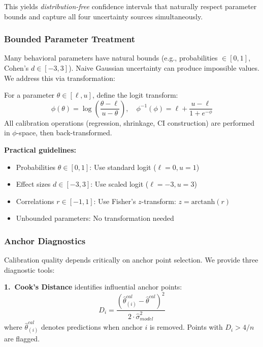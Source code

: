 This yields \textit{distribution-free} confidence intervals that naturally respect
parameter bounds and capture all four uncertainty sources simultaneously.

\subsubsection{Bounded Parameter Treatment}
\label{sec:AN-bounded}

Many behavioral parameters have natural bounds (e.g., probabilities $\in [0,1]$,
Cohen's $d \in [-3, 3]$). Naive Gaussian uncertainty can produce impossible values.
We address this via transformation:

\begin{definition}
\label{def:bounded-transform}
For a parameter $\theta \in [\ell, u]$, define the logit transform:
\begin{equation}
    \phi(\theta) = \log\left(\frac{\theta - \ell}{u - \theta}\right), \quad
    \phi^{-1}(\phi) = \ell + \frac{u - \ell}{1 + e^{-\phi}}
    \label{eq:logit-transform}
\end{equation}
All calibration operations (regression, shrinkage, CI construction) are performed
in $\phi$-space, then back-transformed.
\end{definition}

\textbf{Practical guidelines:}
\begin{itemize}[nosep]
    \item Probabilities $\theta \in [0,1]$: Use standard logit ($\ell = 0, u = 1$)
    \item Effect sizes $d \in [-3, 3]$: Use scaled logit ($\ell = -3, u = 3$)
    \item Correlations $r \in [-1, 1]$: Use Fisher's $z$-transform: $z = \text{arctanh}(r)$
    \item Unbounded parameters: No transformation needed
\end{itemize}

\subsubsection{Anchor Diagnostics}
\label{sec:AN-anchor-diagnostics}

Calibration quality depends critically on anchor point selection. We provide three
diagnostic tools:

\textbf{1.\ Cook's Distance} identifies influential anchor points:
\begin{equation}
    D_i = \frac{(\hat{\theta}^{cal}_{(i)} - \hat{\theta}^{cal})^2}{2 \cdot \hat{\sigma}^2_{model}}
    \label{eq:cooks-distance}
\end{equation}
where $\hat{\theta}^{cal}_{(i)}$ denotes predictions when anchor $i$ is removed.
Points with $D_i > 4/n$ are flagged.

